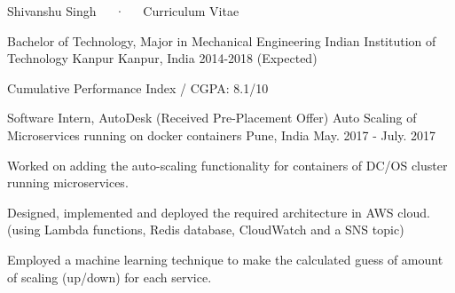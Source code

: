 \documentclass[11pt, a4paper]{cv}
\begin{document}
\makecvheader

\makecvfooter
  {}
  {Shivanshu Singh~~~·~~~Curriculum Vitae}
  {\thepage}


\begin{cventries}

  \cventry
    {Bachelor of Technology, Major in Mechanical Engineering} %
    {Indian Institution of Technology Kanpur} %
    {Kanpur, India} %
        {2014-2018 (Expected)} %
    {
      \begin{cvitems} %
        \item {Cumulative Performance Index / CGPA: 8.1/10}
      \end{cvitems}
    }

\end{cventries}



\begin{cventries}

  \cventry
    {Software Intern, AutoDesk (Received Pre-Placement Offer)} %
    {Auto Scaling of Microservices running on docker containers} %
    {Pune, India} %
    {May. 2017 - July. 2017} %
    {
      \begin{cvitems} %
        \item {Worked on adding the auto-scaling functionality for containers of DC/OS cluster running microservices.}
        \item {Designed, implemented and deployed the required architecture in AWS cloud. (using Lambda functions, Redis database, CloudWatch and a SNS topic)}
        \item {Employed a machine learning technique to make the calculated guess of amount of scaling (up/down) for each service.}
      \end{cvitems}
    }

\end{cventries}

\end{document}
